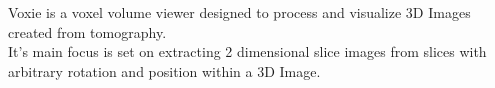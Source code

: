 Voxie is a voxel volume viewer designed to process and visualize 3D Images created from tomography.
\\
It's main focus is set on extracting 2 dimensional slice images from slices with arbitrary rotation and position within a 3D Image.